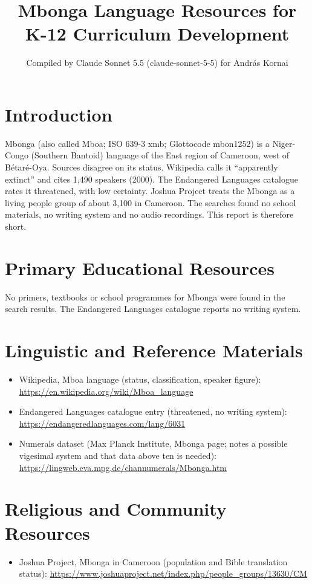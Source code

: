 \documentclass[12pt]{article}
\title{Mbonga Language Resources for K-12 Curriculum Development}
\author{Compiled by Claude Sonnet 5.5 (claude-sonnet-5-5) for Andr\'as Kornai}
\date{}
\begin{document}
\maketitle

\section{Introduction}
Mbonga (also called Mboa; ISO 639-3 xmb; Glottocode mbon1252) is a Niger-Congo (Southern Bantoid) language of the East region of Cameroon, west of B\'etar\'e-Oya. Sources disagree on its status. Wikipedia calls it ``apparently extinct'' and cites 1,490 speakers (2000). The Endangered Languages catalogue rates it threatened, with low certainty. Joshua Project treats the Mbonga as a living people group of about 3,100 in Cameroon. The searches found no school materials, no writing system and no audio recordings. This report is therefore short.

\section{Primary Educational Resources}
No primers, textbooks or school programmes for Mbonga were found in the search results. The Endangered Languages catalogue reports no writing system.

\section{Linguistic and Reference Materials}
\begin{itemize}
\item Wikipedia, Mboa language (status, classification, speaker figure): \url{https://en.wikipedia.org/wiki/Mboa_language}
\item Endangered Languages catalogue entry (threatened, no writing system): \url{https://endangeredlanguages.com/lang/6031}
\item Numerals dataset (Max Planck Institute, Mbonga page; notes a possible vigesimal system and that data above ten is needed): \url{https://lingweb.eva.mpg.de/channumerals/Mbonga.htm}
\end{itemize}

\section{Religious and Community Resources}
\begin{itemize}
\item Joshua Project, Mbonga in Cameroon (population and Bible translation status): \url{https://www.joshuaproject.net/index.php/people_groups/13630/CM}
\end{itemize}
\end{document}
